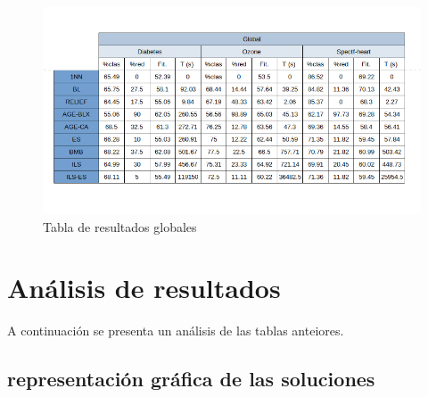 \documentclass[12pt, spanish]{article}
\begin{document}
\begin{figure}[htbp]
  \centering
  \includegraphics[width=\textwidth]{tables3.png}
  \caption{Tabla de resultados globales}
  \label{fig:imagen}
\end{figure}


\pagebreak
\section{Análisis de resultados}
A continuación se presenta un análisis de las tablas anteiores. 
\subsection{representación gráfica de las soluciones}
\end{document}
